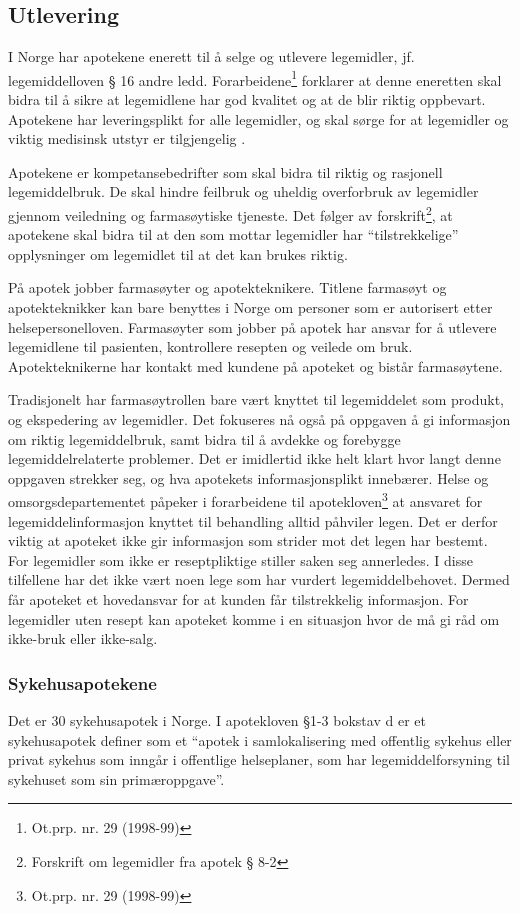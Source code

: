 \subsection{Utlevering}
I Norge har apotekene enerett til å selge og utlevere legemidler, jf. legemiddelloven § 16 andre ledd. Forarbeidene\footnote{Ot.prp. nr. 29 (1998-99)} forklarer at denne eneretten skal bidra til å sikre at legemidlene har god kvalitet og at de blir riktig oppbevart. Apotekene har leveringsplikt for alle legemidler, og skal sørge for at legemidler og viktig medisinsk utstyr er tilgjengelig \citep{apotekOgLegemidler2013}.
 
Apotekene er kompetansebedrifter som skal bidra til riktig og rasjonell legemiddelbruk. De skal hindre feilbruk og uheldig overforbruk av legemidler gjennom veiledning og farmasøytiske tjeneste. Det følger av forskrift\footnote{Forskrift om legemidler fra apotek § 8-2}, at apotekene skal bidra til at den som mottar legemidler har “tilstrekkelige” opplysninger om legemidlet til at det kan brukes riktig.

På apotek jobber farmasøyter og apotekteknikere. Titlene farmasøyt og apotekteknikker kan bare benyttes i Norge om personer som er autorisert etter helsepersonelloven. Farmasøyter som jobber på apotek har ansvar for å utlevere legemidlene til pasienten, kontrollere resepten og veilede om bruk. Apotekteknikerne har kontakt med kundene på apoteket og bistår farmasøytene.
 
Tradisjonelt har farmasøytrollen bare vært knyttet til legemiddelet som produkt, og ekspedering av legemidler. Det fokuseres nå også på oppgaven å gi informasjon om riktig legemiddelbruk, samt bidra til å avdekke og forebygge legemiddelrelaterte problemer. Det er imidlertid ikke helt klart hvor langt denne oppgaven strekker seg, og hva apotekets informasjonsplikt innebærer. Helse og omsorgsdepartementet påpeker i forarbeidene til apotekloven\footnote{Ot.prp. nr. 29 (1998-99)} at ansvaret for legemiddelinformasjon knyttet til behandling alltid påhviler legen. Det er derfor viktig at apoteket ikke gir informasjon som strider mot det legen har bestemt. For legemidler som ikke er reseptpliktige stiller saken seg annerledes. I disse tilfellene har det ikke vært noen lege som har vurdert legemiddelbehovet. Dermed får apoteket et hovedansvar for at kunden får tilstrekkelig informasjon. For legemidler uten resept kan apoteket komme i en situasjon hvor de må gi råd om ikke-bruk eller ikke-salg.

\subsubsection{Sykehusapotekene}
Det er 30 sykehusapotek i Norge. I apotekloven §1-3 bokstav d er et sykehusapotek definer som et “apotek i samlokalisering med offentlig sykehus eller privat sykehus som inngår i offentlige helseplaner, som har legemiddelforsyning til sykehuset som sin primæroppgave”. 

